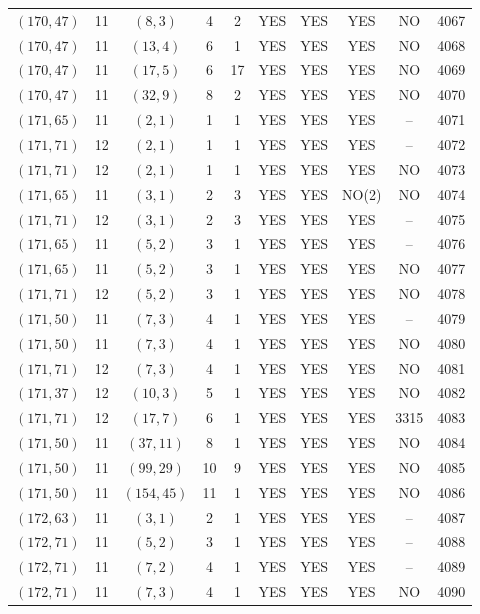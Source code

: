\begin{longtable}{|c|c|c|c|c|c|c|c|c|c|}
$(170, 47)$ & 11 & $(8, 3)$ & 4 & 2 & YES & YES & YES & NO & 4067\\
$(170, 47)$ & 11 & $(13, 4)$ & 6 & 1 & YES & YES & YES & NO & 4068\\
$(170, 47)$ & 11 & $(17, 5)$ & 6 & 17 & YES & YES & YES & NO & 4069\\
$(170, 47)$ & 11 & $(32, 9)$ & 8 & 2 & YES & YES & YES & NO & 4070\\
$(171, 65)$ & 11 & $(2, 1)$ & 1 & 1 & YES & YES & YES & -- & 4071\\
$(171, 71)$ & 12 & $(2, 1)$ & 1 & 1 & YES & YES & YES & -- & 4072\\
$(171, 71)$ & 12 & $(2, 1)$ & 1 & 1 & YES & YES & YES & NO & 4073\\
$(171, 65)$ & 11 & $(3, 1)$ & 2 & 3 & YES & YES & NO(2) & NO & 4074\\
$(171, 71)$ & 12 & $(3, 1)$ & 2 & 3 & YES & YES & YES & -- & 4075\\
$(171, 65)$ & 11 & $(5, 2)$ & 3 & 1 & YES & YES & YES & -- & 4076\\
$(171, 65)$ & 11 & $(5, 2)$ & 3 & 1 & YES & YES & YES & NO & 4077\\
$(171, 71)$ & 12 & $(5, 2)$ & 3 & 1 & YES & YES & YES & NO & 4078\\
$(171, 50)$ & 11 & $(7, 3)$ & 4 & 1 & YES & YES & YES & -- & 4079\\
$(171, 50)$ & 11 & $(7, 3)$ & 4 & 1 & YES & YES & YES & NO & 4080\\
$(171, 71)$ & 12 & $(7, 3)$ & 4 & 1 & YES & YES & YES & NO & 4081\\
$(171, 37)$ & 12 & $(10, 3)$ & 5 & 1 & YES & YES & YES & NO & 4082\\
$(171, 71)$ & 12 & $(17, 7)$ & 6 & 1 & YES & YES & YES & 3315 & 4083\\
$(171, 50)$ & 11 & $(37, 11)$ & 8 & 1 & YES & YES & YES & NO & 4084\\
$(171, 50)$ & 11 & $(99, 29)$ & 10 & 9 & YES & YES & YES & NO & 4085\\
$(171, 50)$ & 11 & $(154, 45)$ & 11 & 1 & YES & YES & YES & NO & 4086\\
$(172, 63)$ & 11 & $(3, 1)$ & 2 & 1 & YES & YES & YES & -- & 4087\\
$(172, 71)$ & 11 & $(5, 2)$ & 3 & 1 & YES & YES & YES & -- & 4088\\
$(172, 71)$ & 11 & $(7, 2)$ & 4 & 1 & YES & YES & YES & -- & 4089\\
$(172, 71)$ & 11 & $(7, 3)$ & 4 & 1 & YES & YES & YES & NO & 4090\\

\end{longtable}
